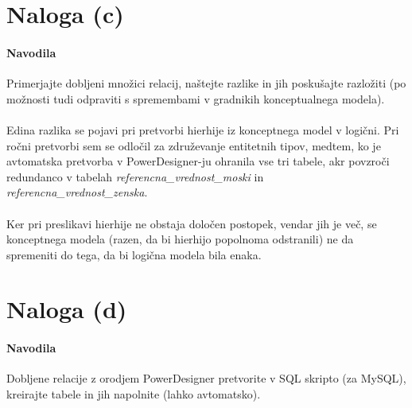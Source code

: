 \documentclass[a4paper,12pt]{report}
\begin{document}
\pagebreak

\section*{Naloga (c)}
\paragraph{Navodila}
\begin{em}
  Primerjajte dobljeni množici relacij, naštejte razlike in jih poskušajte razložiti (po možnosti tudi odpraviti s spremembami v gradnikih konceptualnega modela).
\end{em}

\paragraph{}
Edina razlika se pojavi pri pretvorbi hierhije iz konceptnega model v logični. Pri ročni pretvorbi sem se odločil za združevanje entitetnih tipov, medtem, ko je avtomatska pretvorba v PowerDesigner-ju ohranila vse tri tabele, akr povzroči redundanco v tabelah \textit{referencna\_vrednost\_moski} in \textit{referencna\_vrednost\_zenska}.

\paragraph{}
Ker pri preslikavi hierhije ne obstaja določen postopek, vendar jih je več, se konceptnega modela (razen, da bi hierhijo popolnoma odstranili) ne da spremeniti do tega, da bi logična modela bila enaka.


\section*{Naloga (d)}
\paragraph{Navodila}
\begin{em}
  Dobljene relacije z orodjem PowerDesigner pretvorite v SQL skripto (za MySQL), kreirajte tabele in jih napolnite (lahko avtomatsko).
\end{em}
\end{document}
